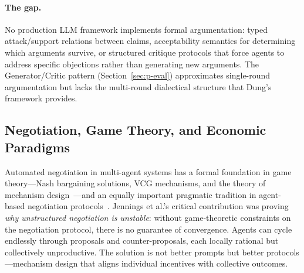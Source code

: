\documentclass{article}
\begin{document}
\paragraph{The gap.}
No production LLM framework implements formal argumentation: typed attack/support
relations between claims, acceptability semantics for determining which arguments
survive, or structured critique protocols that force agents to address specific
objections rather than generating new arguments. The Generator/Critic pattern
(Section~\ref{sec:p-eval}) approximates single-round argumentation but lacks the
multi-round dialectical structure that Dung's framework provides.

\subsection{Negotiation, Game Theory, and Economic Paradigms}
\label{sec:p-negotiate}

%
%
%
%
%

Automated negotiation in multi-agent systems has a formal foundation in game theory---Nash
bargaining solutions, VCG mechanisms, and the theory of mechanism
design~\citep{rosenschein1994rules}---and an equally important pragmatic tradition in
agent-based negotiation protocols~\citep{jennings2001automated}. Jennings et al.'s
critical contribution was proving \emph{why unstructured negotiation is unstable}: without
game-theoretic constraints on the negotiation protocol, there is no guarantee of
convergence. Agents can cycle endlessly through proposals and counter-proposals, each
locally rational but collectively unproductive. The solution is not better prompts but
better protocols---mechanism design that aligns individual incentives with collective
outcomes.
\end{document}
